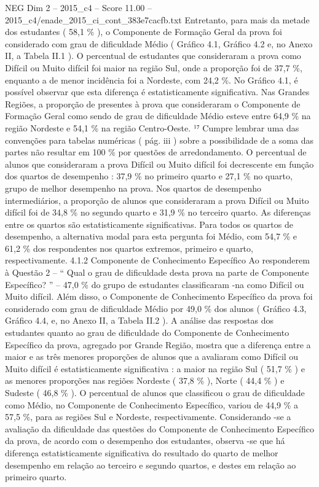 \begin{textsample}{NEG Dim 2 – 2015\_c4 – Score 11.00 – 2015\_c4/enade\_2015\_ci\_cont\_383e7cacfb.txt}
Entretanto, para mais da metade dos estudantes ( 58,1 \% ), o Componente de Formação Geral da prova foi considerado com grau de dificuldade Médio ( Gráfico 4.1, Gráfico 4.2 e, no Anexo II, a Tabela II.1 ).
O percentual de estudantes que consideraram a prova como Difícil ou Muito difícil foi maior na região Sul, onde a proporção foi de 37,7 \%, enquanto a de menor incidência foi a Nordeste, com 24,2 \%.
No Gráfico 4.1, é possível observar que esta diferença é estatisticamente significativa.
Nas Grandes Regiões, a proporção de presentes à prova que consideraram o Componente de Formação Geral como sendo de grau de dificuldade Médio esteve entre 64,9 \% na região Nordeste e 54,1 \% na região Centro-Oeste. ¹⁷ Cumpre lembrar uma das convenções para tabelas numéricas ( pág. iii ) sobre a possibilidade de a soma das partes não resultar em 100 \% por questões de arredondamento.
O percentual de alunos que consideraram a prova Difícil ou Muito difícil foi decrescente em função dos quartos de desempenho : 37,9 \% no primeiro quarto e 27,1 \% no quarto, grupo de melhor desempenho na prova.
Nos quartos de desempenho intermediários, a proporção de alunos que consideraram a prova Difícil ou Muito difícil foi de 34,8 \% no segundo quarto e 31,9 \% no terceiro quarto.
As diferenças entre os quartos são estatisticamente significativas.
Para todos os quartos de desempenho, a alternativa modal para esta pergunta foi Médio, com 54,7 \% e 61,2 \% dos respondentes nos quartos extremos, primeiro e quarto, respectivamente. 4.1.2 Componente de Conhecimento Específico Ao responderem à Questão 2 – “ Qual o grau de dificuldade desta prova na parte de Componente Específico? ” – 47,0 \% do grupo de estudantes classificaram -na como Difícil ou Muito difícil.
Além disso, o Componente de Conhecimento Específico da prova foi considerado com grau de dificuldade Médio por 49,0 \% dos alunos ( Gráfico 4.3, Gráfico 4.4, e, no Anexo II, a Tabela II.2 ).
A análise das respostas dos estudantes quanto ao grau de dificuldade do Componente de Conhecimento Específico da prova, agregado por Grande Região, mostra que a diferença entre a maior e as três menores proporções de alunos que a avaliaram como Difícil ou Muito difícil é estatisticamente significativa : a maior na região Sul ( 51,7 \% ) e as menores proporções nas regiões Nordeste ( 37,8 \% ), Norte ( 44,4 \% ) e Sudeste ( 46,8 \% ).
O percentual de alunos que classificou o grau de dificuldade como Médio, no Componente de Conhecimento Específico, variou de 44,9 \% a 57,5 \%, para as regiões Sul e Nordeste, respectivamente.
Considerando -se a avaliação da dificuldade das questões do Componente de Conhecimento Específico da prova, de acordo com o desempenho dos estudantes, observa -se que há diferença estatisticamente significativa do resultado do quarto de melhor desempenho em relação ao terceiro e segundo quartos, e destes em relação ao primeiro quarto.

\end{textsample}
